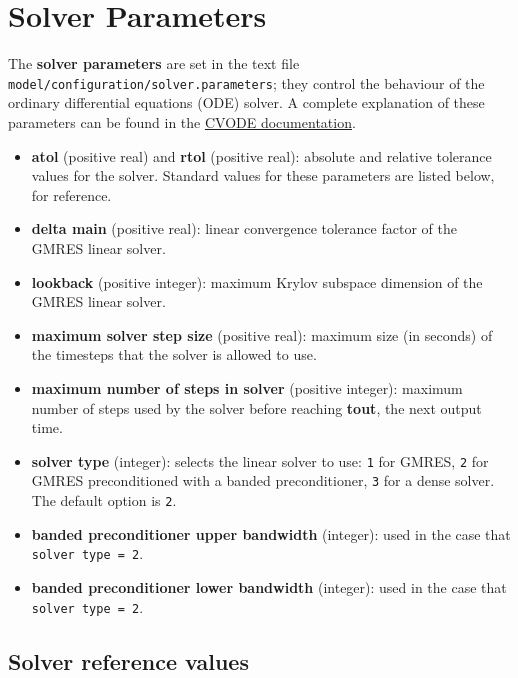 \section{Solver Parameters} \label{sec:solver}

The \textbf{solver parameters} are set in the text file
\texttt{model/configuration/solver.parameters}; they control the
behaviour of the ordinary differential equations (ODE) solver. A
complete explanation of these parameters can be found in the
\href{https://computation.llnl.gov/projects/sundials/sundials-software}{CVODE
documentation}.

\begin{itemize}
\item \textbf{atol} (positive real) and \textbf{rtol} (positive real):
absolute and relative tolerance values for the solver. Standard values
for these parameters are listed below, for reference.
\item \textbf{delta main} (positive real): linear convergence
tolerance factor of the GMRES linear solver.
\item \textbf{lookback} (positive integer): maximum Krylov subspace
dimension of the GMRES linear solver.
\item \textbf{maximum solver step size} (positive real): maximum size
(in seconds) of the timesteps that the solver is allowed to use.
\item \textbf{maximum number of steps in solver} (positive integer):
maximum number of steps used by the solver before reaching
\textbf{tout}, the next output time.
\item \textbf{solver type} (integer): selects the linear solver to
use: \texttt{1} for GMRES, \texttt{2} for GMRES preconditioned with a
banded preconditioner, \texttt{3} for a dense solver. The default
option is \texttt{2}.
\item \textbf{banded preconditioner upper bandwidth} (integer): used
in the case that \texttt{solver\ type\ =\ 2}.
\item \textbf{banded preconditioner lower bandwidth} (integer): used
in the case that \texttt{solver\ type\ =\ 2}.
\end{itemize}

\subsection{Solver reference values} \label{subsec:solver-reference-values}

